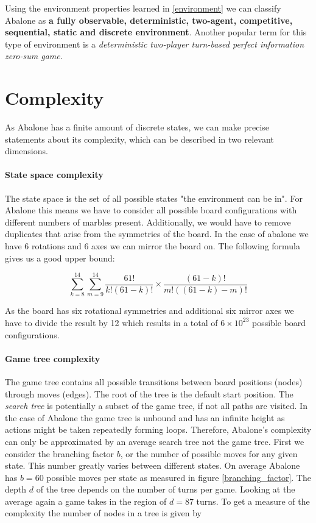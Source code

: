 Using the environment properties learned in \ref{environment} we can classify Abalone as \textbf{a fully observable, deterministic, two-agent, competitive, sequential, static and discrete environment}. Another popular term for this type of environment is a \textit{deterministic two-player  turn-based perfect information zero-sum game}.

\section{Complexity}
As Abalone has a finite amount of discrete states, we can make precise statements about its complexity, which can be described in two relevant dimensions.

\paragraph{State space complexity}
The state space is the set of all possible states "the environment can be in".\cite[p. 150]{russell_artificial_2021} For Abalone this means we have to consider all possible board configurations with different numbers of marbles present. Additionally, we would have to remove duplicates that arise from the symmetries of the board. In the case of abalone we have 6 rotations and 6 axes we can mirror the board on. The following formula gives us a good upper bound:

\begin{equation}
    \sum_{k=8}^{14}\sum_{m=9}^{14}\frac{61!}{k!(61-k)!}\times\frac{(61-k)!}{m!((61-k)-m)!}
\end{equation}

As the board has six rotational symmetries and additional six mirror axes we have to divide the result by 12 which results in a total of $ 6 \times 10^{23} $ possible board configurations. \cite[p. 4]{lemmens_constructing_2005}

\paragraph{Game tree complexity} The game tree contains all possible transitions between board positions (nodes) through moves (edges). The root of the tree is the default start position. The \textit{search tree} is potentially a subset of the game tree, if not all paths are visited. In the case of Abalone the game tree is unbound and has an infinite height as actions might be taken repeatedly forming loops. Therefore, Abalone's complexity can only be approximated by an average search tree not the game tree. First we consider the branching factor $ b $, or the number of possible moves for any given state. This number greatly varies between different states. On average Abalone has $ b = 60 $ possible moves per state as measured in figure \ref{branching_factor}. The depth $ d $ of the tree depends on the number of turns per game. Looking at the average again a game takes in the region of $ d = 87 $ turns. To get a measure of the complexity the number of nodes in a tree is given by

